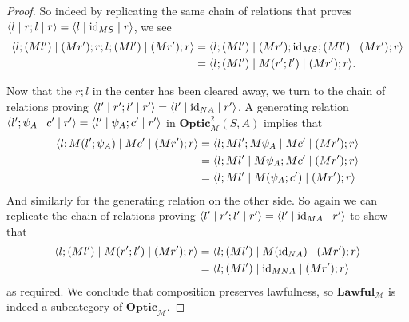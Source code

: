 \documentclass[11pt,letterpaper]{article}
\theoremstyle{plain}
\theoremstyle{definition}
\newcommand{\M}{\mathscr{M}}
\newcommand{\Optic}{\mathbf{Optic}}
\newcommand{\Twoptic}{\mathbf{Optic}^2}
\newcommand{\Lawful}{\mathbf{Lawful}}
\newcommand{\id}{\mathrm{id}}
\newcommand{\repthree}[3]{{\ensuremath \langle #1 \mid #2 \mid #3 \rangle}}
\begin{document}
\begin{proof}
  So indeed by replicating the same chain of relations that proves $\repthree{l}{r;l}{r} =\repthree{l}{\id_{MS}}{r}$, we see
  \begin{align*}
    \repthree{l;(Ml')}{(Mr');r;l;(Ml')}{(Mr') ; r} 
    &= \repthree{l;(Ml')}{(Mr');\id_{MS};(Ml')}{(Mr') ; r} \\
    &= \repthree{l;(Ml')}{M(r';l')}{(Mr') ; r}.
  \end{align*}

  Now that the $r;l$ in the center has been cleared away, we turn to the chain of relations proving $\repthree{l'}{r';l'}{r'} = \repthree{l'}{\id_{NA}}{r'}$. A generating relation $\repthree{l';\psi_A}{c'}{r'} = \repthree{l'}{\psi_A ; c'}{r'}$ in $\Twoptic_\M(S, A)$ implies that
  \begin{align*}
    \repthree{l;M(l';\psi_A)}{Mc'}{(Mr') ; r}
    &= \repthree{l;Ml';M\psi_A}{Mc'}{(Mr') ; r} \\
    &= \repthree{l;Ml'}{M\psi_A ; Mc'}{(Mr') ; r} \\
    &= \repthree{l;Ml'}{M(\psi_A;c')}{(Mr') ; r}
  \end{align*}
  And similarly for the generating relation on the other side. So again we can replicate the chain of relations proving $\repthree{l'}{r';l'}{r'} = \repthree{l'}{\id_{MA}}{r'}$ to show that
  \begin{align*}
    \repthree{l;(Ml')}{M(r';l')}{(Mr') ; r} 
    &= \repthree{l;(Ml')}{M(\id_{NA})}{(Mr') ; r} \\
    &= \repthree{l;(Ml')}{\id_{MNA}}{(Mr') ; r}
  \end{align*}
as required. We conclude that composition preserves lawfulness, so $\Lawful_\M$ is indeed a subcategory of $\Optic_\M$.
\end{proof}
\end{document}
